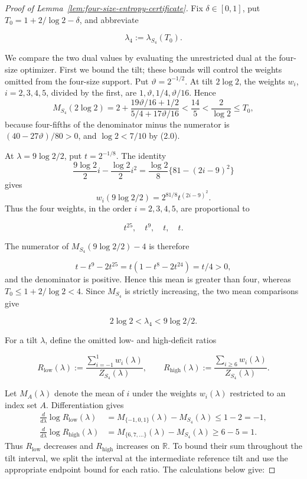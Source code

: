 \documentclass[a4paper,10pt,reqno]{amsart}
\numberwithin{equation}{section}
\theoremstyle{plain}
\theoremstyle{remark}
\begin{document}
\begin{proof}[Proof of Lemma~\ref{lem:four-size-entropy-certificate}]
Fix \(\delta\in[0,1]\), put
\(T_0=1+2/{\log 2}-\delta\), and abbreviate

\[
 \lambda_4:=\lambda_{S_4}(T_0).
\]

We compare the two dual values by evaluating the unrestricted dual at the
four-size optimizer. First we bound the tilt; these bounds will control the
weights omitted from the four-size support. Put \(\vartheta=2^{-1/2}\).
At tilt \(2\log 2\), the weights \(w_i\), \(i=2,3,4,5\), divided by the
first, are \(1,\vartheta,1/4,\vartheta/16\). Hence
\begin{equation}
 M_{S_4}(2\log 2)=2+\frac{19\vartheta/16+1/2}{5/4+17\vartheta/16}
 <\frac{14}{5}<\frac2{\log 2}\le T_0,
 \label{eq:E-low-tilt}
\end{equation}
because four-fifths of the denominator minus the numerator is
\((40-27\vartheta)/80>0\), and \(\log 2<7/10\) by (2.0).

At \(\lambda=9{\log 2}/2\), put \(t=2^{-1/8}\). The identity
\[
 \frac{9\log 2}{2}i-\frac{\log 2}{2}i^2
 =\frac{\log 2}{8}\{81-(2i-9)^2\}
\]
gives
\[
 w_i(9{\log 2}/2)=2^{81/8}t^{(2i-9)^2}.
\]
Thus the four weights, in the order
\(i=2,3,4,5\), are proportional to

\[
 t^{25},\quad t^9,\quad t,\quad t.
\]

The numerator of \(M_{S_4}(9{\log 2}/2)-4\) is therefore

\begin{equation}
 t-t^9-2t^{25}=t(1-t^8-2t^{24})=t/4>0,                 \label{eq:E-high-tilt}
\end{equation}
and the denominator is positive.  Hence this mean is greater than four,
whereas \(T_0\le1+2/{\log 2}<4\).  Since \(M_{S_4}\) is strictly
increasing, the two mean comparisons give

\begin{equation}
 2{\log 2}<\lambda_4<9{\log 2}/2.                                     \label{eq:E-tilt-bracket}
\end{equation}

For a tilt \(\lambda\), define the omitted low- and high-deficit ratios

\[
 R_{\mathrm{low}}(\lambda):=
 \frac{\sum_{i=-1}^{1}w_i(\lambda)}{Z_{S_4}(\lambda)},
 \qquad
 R_{\mathrm{high}}(\lambda):=
 \frac{\sum_{i\ge6}w_i(\lambda)}{Z_{S_4}(\lambda)}.
\]

Let \(M_A(\lambda)\) denote the mean of \(i\) under the weights
\(w_i(\lambda)\) restricted to an index set \(A\). Differentiation gives
\[
\begin{aligned}
 \frac{d}{d\lambda}\log R_{\mathrm{low}}(\lambda)
 &=M_{\{-1,0,1\}}(\lambda)-M_{S_4}(\lambda)
 \le 1-2=-1,\\
 \frac{d}{d\lambda}\log R_{\mathrm{high}}(\lambda)
 &=M_{\{6,7,\ldots\}}(\lambda)-M_{S_4}(\lambda)
 \ge 6-5=1.
\end{aligned}
\]
Thus \(R_{\mathrm{low}}\) decreases and \(R_{\mathrm{high}}\) increases
on \(\mathbb R\). To bound their sum throughout the tilt interval, we split
the interval at the intermediate reference tilt and use the appropriate
endpoint bound for each ratio. The calculations below give:


\end{proof}
\end{document}
